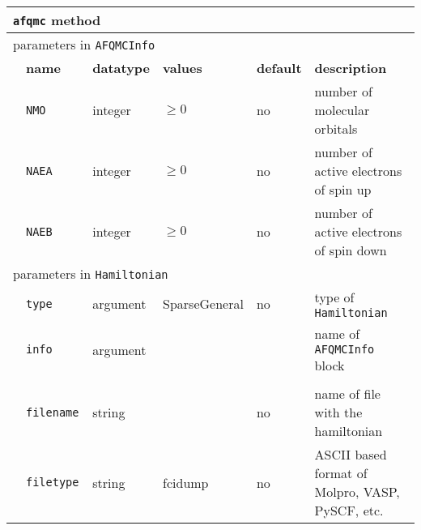 \begin{table}[h]
\begin{center}
\begin{tabularx}{\textwidth}{l l l l l l }
\hline
\multicolumn{6}{l}{\texttt{afqmc} method} \\
\hline
\multicolumn{6}{l}{parameters in \texttt{AFQMCInfo}} \\
   &   \bfseries name     & \bfseries datatype & \bfseries values & \bfseries default   & \bfseries description \\
   &   \texttt{NMO             } &  integer     & $\ge 0$ & no & number of molecular orbitals \\
   &   \texttt{NAEA            } &  integer     & $\ge 0$ & no & number of active electrons of spin up \\
   &   \texttt{NAEB            } &  integer     & $\ge 0$ & no & number of active electrons of spin down \\
\multicolumn{6}{l}{parameters in \texttt{Hamiltonian}}  \\
   &   \texttt{type            } &  argument   & SparseGeneral & no   & type of \texttt{Hamiltonian} \\
   &   \texttt{info            } &  argument   &               &      & name of \texttt{AFQMCInfo} block \\\\
   &   \texttt{filename        } &  string     &               & no   & name of file with the hamiltonian \\
   &   \texttt{filetype        } &  string     & fcidump       & no   & ASCII based format of Molpro, VASP, PySCF, etc. \\

\end{tabularx}
\end{center}
\end{table}
